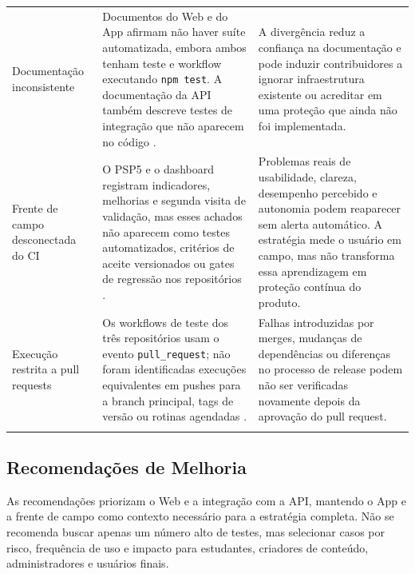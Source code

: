 {\begin{longtable}{>{\raggedright\arraybackslash}p{2.9cm} >{\raggedright\arraybackslash}p{5.1cm} >{\raggedright\arraybackslash}p{5.1cm}}
Documentação inconsistente
&
Documentos do Web e do App afirmam não haver suíte automatizada, embora ambos
tenham teste e workflow executando \texttt{npm test}. A documentação da API
também descreve testes de integração que não aparecem no código
\cite{educado-repos}.
&
A divergência reduz a confiança na documentação e pode induzir contribuidores a
ignorar infraestrutura existente ou acreditar em uma proteção que ainda não foi
implementada.
\\
\addlinespace

Frente de campo desconectada do CI
&
O PSP5 e o dashboard registram indicadores, melhorias e segunda visita de
validação, mas esses achados não aparecem como testes automatizados, critérios
de aceite versionados ou gates de regressão nos repositórios
\cite{psp5,dashboard,educado-repos}.
&
Problemas reais de usabilidade, clareza, desempenho percebido e autonomia podem
reaparecer sem alerta automático. A estratégia mede o usuário em campo, mas não
transforma essa aprendizagem em proteção contínua do produto.
\\
\addlinespace

Execução restrita a pull requests
&
Os workflows de teste dos três repositórios usam o evento
\texttt{pull\_request}; não foram identificadas execuções equivalentes em pushes
para a branch principal, tags de versão ou rotinas agendadas
\cite{educado-repos}.
&
Falhas introduzidas por merges, mudanças de dependências ou diferenças no
processo de release podem não ser verificadas novamente depois da aprovação do
pull request.
\\
\addlinespace
\bottomrule
\end{longtable}
}



\subsection{Recomendações de Melhoria}

As recomendações priorizam o Web e a integração com a API, mantendo o App e a
frente de campo como contexto necessário para a estratégia completa. Não se
recomenda buscar apenas um número alto de testes, mas selecionar casos por risco,
frequência de uso e impacto para estudantes, criadores de conteúdo,
administradores e usuários finais.

